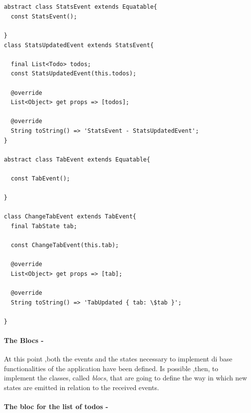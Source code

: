 \begin{code}
\mbox{}
 \mbox{}
\label{code:2.14}
\begin{verbatim}


abstract class StatsEvent extends Equatable{
  const StatsEvent();

}
class StatsUpdatedEvent extends StatsEvent{

  final List<Todo> todos;
  const StatsUpdatedEvent(this.todos);

  @override
  List<Object> get props => [todos];

  @override
  String toString() => 'StatsEvent - StatsUpdatedEvent';
}

abstract class TabEvent extends Equatable{

  const TabEvent();

}

class ChangeTabEvent extends TabEvent{
  final TabState tab;

  const ChangeTabEvent(this.tab);

  @override
  List<Object> get props => [tab];

  @override
  String toString() => 'TabUpdated { tab: \$tab }';

}
\end{verbatim}
\mbox{}
\end{code}

\paragraph{The Blocs - }
\label{subpar:todo_app_bloc_core_state}

At this point ,both the events and the states necessary to implement di base functionalities of the application have been defined. Is possible ,then, to implement the classes, called \textit{blocs}, that are going to define the way in which new states are emitted in relation to the received events.

\paragraph{The bloc for the list of todos - }
\label{subpar:todo_app_bloc_core_state}

